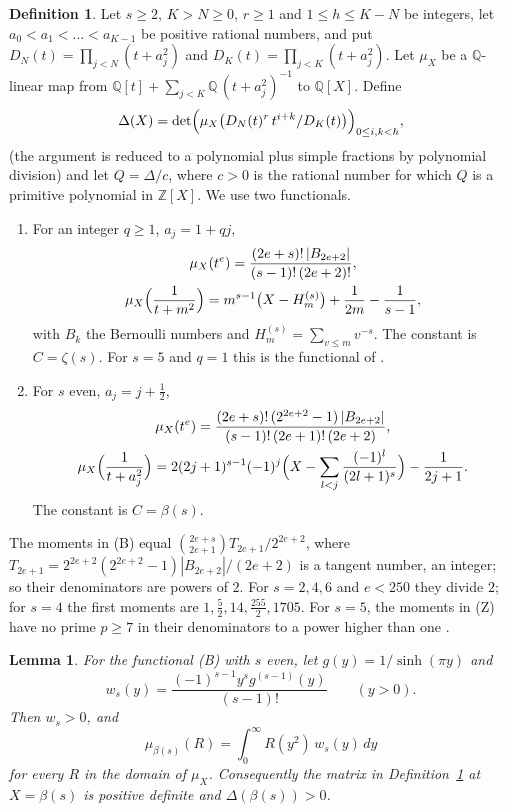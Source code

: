 \documentclass[11pt]{article}
\newtheorem{lemma}[theorem]{Lemma}
\theoremstyle{definition}
\newtheorem{definition}[theorem]{Definition}
\begin{document}
\begin{definition}\label{def:fz}
Let $s\ge2$, $K>N\ge0$, $r\ge1$ and $1\le h\le K-N$ be integers, let $a_0<a_1<\dots<a_{K-1}$ be positive rational numbers, and put $D_N(t)=\prod_{j<N}(t+a_j^2)$ and $D_K(t)=\prod_{j<K}(t+a_j^2)$. Let $\mu_X$ be a $\mathbb Q$-linear map from $\mathbb Q[t]+\sum_{j<K}\mathbb Q\,(t+a_j^2)^{-1}$ to $\mathbb Q[X]$. Define
\[
\Delta(X)=\det\Bigl(\mu_X\bigl(D_N(t)^r\,t^{i+k}/D_K(t)\bigr)\Bigr)_{0\le i,k<h},
\]
(the argument is reduced to a polynomial plus simple fractions by polynomial division) and let $Q=\Delta/c$, where $c>0$ is the rational number for which $Q$ is a primitive polynomial in $\mathbb Z[X]$. We use two functionals.
\begin{enumerate}
\item[(Z)] For an integer $q\ge1$, $a_j=1+qj$,
\begin{gather*}
\mu_X(t^e)=\frac{(2e+s)!\,|B_{2e+2}|}{(s-1)!\,(2e+2)!},\\
\mu_X\Bigl(\frac1{t+m^2}\Bigr)=m^{s-1}\bigl(X-H^{(s)}_m\bigr)+\frac1{2m}-\frac1{s-1},
\end{gather*}
with $B_k$ the Bernoulli numbers and $H^{(s)}_m=\sum_{v\le m}v^{-s}$. The constant is $C=\zeta(s)$. For $s=5$ and $q=1$ this is the functional of \cite[(2.2), (2.3)]{Fauzan}.
\item[(B)] For $s$ even, $a_j=j+\frac12$,
\begin{gather*}
\mu_X(t^e)=\frac{(2e+s)!\,(2^{2e+2}-1)\,|B_{2e+2}|}{(s-1)!\,(2e+1)!\,(2e+2)},\\
\mu_X\Bigl(\frac1{t+a_j^2}\Bigr)=2(2j+1)^{s-1}(-1)^j\Bigl(X-\sum_{l<j}\frac{(-1)^l}{(2l+1)^s}\Bigr)-\frac1{2j+1}.
\end{gather*}
The constant is $C=\beta(s)$.
\end{enumerate}
\end{definition}

The moments in (B) equal $\binom{2e+s}{2e+1}T_{2e+1}/2^{2e+2}$, where $T_{2e+1}=2^{2e+2}(2^{2e+2}-1)|B_{2e+2}|/(2e+2)$ is a tangent number, an integer; so their denominators are powers of $2$. For $s=2,4,6$ and $e<250$ they divide $2$; for $s=4$ the first moments are $1,\frac52,14,\frac{255}2,1705$. For $s=5$, the moments in (Z) have no prime $p\ge7$ in their denominators to a power higher than one \cite[Section~4.2]{Fauzan}.

\begin{lemma}\label{lem:fzpos}
For the functional (B) with $s$ even, let $g(y)=1/\sinh(\pi y)$ and
\[
w_s(y)=\frac{(-1)^{s-1}y^s g^{(s-1)}(y)}{(s-1)!}\qquad(y>0).
\]
Then $w_s>0$, and
\[
\mu_{\beta(s)}(R)=\int_0^\infty R(y^2)\,w_s(y)\,dy
\]
for every $R$ in the domain of $\mu_X$. Consequently the matrix in Definition~\ref{def:fz} at $X=\beta(s)$ is positive definite and $\Delta(\beta(s))>0$.
\end{lemma}
\end{document}
